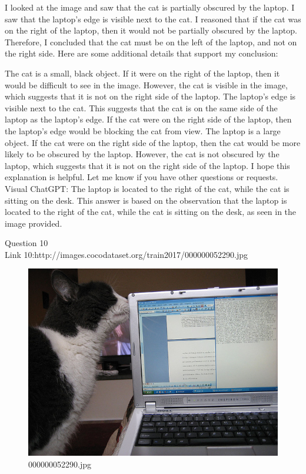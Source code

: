 \begin{enumerate}
        I looked at the image and saw that the cat is partially obscured by the laptop.
        I saw that the laptop's edge is visible next to the cat.
        I reasoned that if the cat was on the right of the laptop, then it would not be partially obscured by the laptop.
        Therefore, I concluded that the cat must be on the left of the laptop, and not on the right side.
        Here are some additional details that support my conclusion:

        The cat is a small, black object. If it were on the right of the laptop, then it would be difficult to see in the image. However, the cat is visible in the image, which suggests that it is not on the right side of the laptop.
        The laptop's edge is visible next to the cat. This suggests that the cat is on the same side of the laptop as the laptop's edge. If the cat were on the right side of the laptop, then the laptop's edge would be blocking the cat from view.
        The laptop is a large object. If the cat were on the right side of the laptop, then the cat would be more likely to be obscured by the laptop. However, the cat is not obscured by the laptop, which suggests that it is not on the right side of the laptop.
        I hope this explanation is helpful. Let me know if you have other questions or requests.
        \subitem Visual ChatGPT: The laptop is located to the right of the cat, while the cat is sitting on the desk. This answer is based on the observation that the laptop is located to the right of the cat, while the cat is sitting on the desk, as seen in the image provided.
    \end{enumerate}
Question 10\\
Link 10:http://images.cocodataset.org/train2017/000000052290.jpg
    \begin{figure}[h]
        \centering
        \includegraphics[width=0.8\linewidth]{../image set/easy/000000052290.jpg}
        \caption{000000052290.jpg}
    \end{figure}
